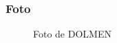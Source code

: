 \documentclass{article}
\begin{document}
\subsubsection*{Foto}
\begin{figure}[H]
\begin{center}
\end{center}
\caption{Foto de DOLMEN}
\end{figure}
\end{document}
